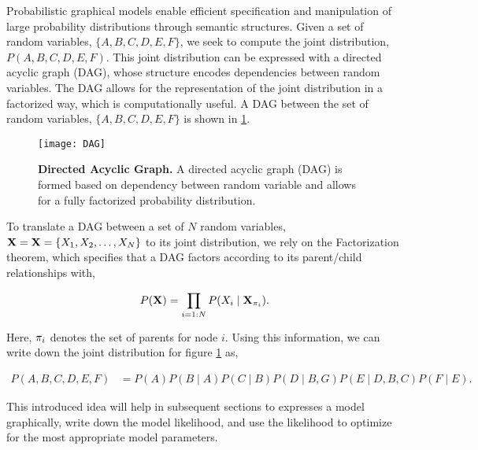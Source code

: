 Probabilistic graphical models enable efficient specification and manipulation of large probability distributions through semantic structures. Given a set of random variables, $\{A,B,C,D,E,F\}$, we seek to compute the joint distribution, $P(A,B,C,D,E,F)$. This joint distribution can be expressed with a directed acyclic graph (DAG), whose structure encodes dependencies between random variables. The DAG allows for the representation of the joint distribution in a factorized way, which is computationally useful. A DAG between the set of random variables, $\{A,B,C,D,E,F\}$ is shown in \ref{fig:DAG}. 

\begin{figure}
\begin{center}
\texttt{[image: DAG]}
\caption{{\bf Directed Acyclic Graph.} A directed acyclic graph (DAG) is formed based on dependency between random variable and allows for a fully factorized probability distribution.}
\label{fig:DAG}
\end{center}
\end{figure}

To translate a DAG between a set of $N$ random variables, ${\bf X}={\bf X}=\{X_{1},X_{2},\dots,X_{N}\}$ to its joint distribution, we rely on the Factorization theorem, which specifies that a DAG factors according to its parent/child relationships with,

\begin{equation}
P({\bf X})=\prod_{i=1:N}P(X_{i} \mid {\bf X}_{\pi_{i}}).
\end{equation}

Here, ${\bf \pi}_{i}$ denotes the set of parents for node $i$. Using this information, we can write down the joint distribution for figure \ref{fig:DAG} as,

\begin{equation}
\begin{split}
P(A,B,C,D,E,F)&=P(A)P(B\mid A)P(C\mid B)P(D \mid B,G)P(E \mid D,B,C)P(F\mid E).
\end{split}
\end{equation}

This introduced idea will help in subsequent sections to expresses a model graphically, write down the model likelihood, and use the likelihood to optimize for the most appropriate model parameters. 

